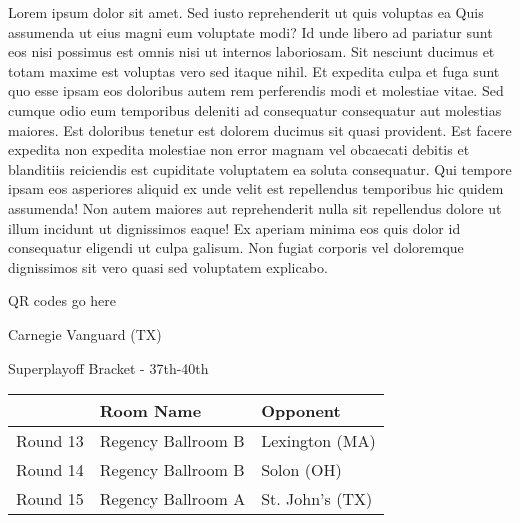 \documentclass{article}%
\begin{document}
\vspace*{8pt}%
\linebreak%
\newline%
\newline%
Lorem ipsum dolor sit amet. Sed iusto reprehenderit ut quis voluptas ea Quis assumenda ut eius magni eum voluptate modi? Id unde libero ad pariatur sunt eos nisi possimus est omnis nisi ut internos laboriosam. Sit nesciunt ducimus et totam maxime est voluptas vero sed itaque nihil. Et expedita culpa et fuga sunt quo esse ipsam eos doloribus autem rem perferendis modi et molestiae vitae.\newline%
\newline%
Sed cumque odio eum temporibus deleniti ad consequatur consequatur aut molestias maiores. Est doloribus tenetur est dolorem ducimus sit quasi provident. Est facere expedita non expedita molestiae non error magnam vel obcaecati debitis et blanditiis reiciendis est cupiditate voluptatem ea soluta consequatur. Qui tempore ipsam eos asperiores aliquid ex unde velit est repellendus temporibus hic quidem assumenda!\newline%
\newline%
Non autem maiores aut reprehenderit nulla sit repellendus dolore ut illum incidunt ut dignissimos eaque! Ex aperiam minima eos quis dolor id consequatur eligendi ut culpa galisum. Non fugiat corporis vel doloremque dignissimos sit vero quasi sed voluptatem explicabo.\newline%
\newline%
%
\vspace*{30pt}%
\begin{center}%
\begin{Huge}%
QR codes go here%
\end{Huge}%
\end{center}%
\newpage%
\begin{center}%
\begin{Huge}%
Carnegie Vanguard (TX)%
\end{Huge}%
\vspace*{8pt}%
\linebreak%
\begin{Large}%
Superplayoff Bracket {-} 37th{-}40th%
\end{Large}%
\end{center}%
%
\begin{tabularx}{\textwidth}{|c|Y|Y|}%
\hline%
&Room Name&Opponent\\%
\hline%
Round 13&Regency Ballroom B&Lexington (MA)\\%
Round 14&Regency Ballroom B&Solon (OH)\\%
Round 15&Regency Ballroom A&St. John's (TX)\\%
\hline%
\end{tabularx}%
\end{document}
